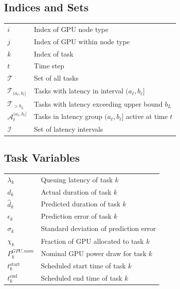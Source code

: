 \documentclass[preprint,12pt]{elsarticle}
\begin{document}
\vspace{1em}

\subsection*{Indices and Sets}
\begin{tabular}{ll}
$i$ & Index of GPU node type \\
$j$ & Index of GPU within node type \\
$k$ & Index of task \\
$t$ & Time step \\
$\mathcal{T}$ & Set of all tasks \\
$\mathcal{T}_{(a_\ell, b_\ell]}$ & Tasks with latency in interval $(a_\ell, b_\ell]$ \\
$\mathcal{T}_{>b_L}$ & Tasks with latency exceeding upper bound $b_L$ \\
$\mathcal{A}_t^{(a_\ell, b_\ell]}$ & Tasks in latency group $(a_\ell, b_\ell]$ active at time $t$ \\
$\mathcal{I}$ & Set of latency intervals \\
\end{tabular}

\vspace{1em}

\subsection*{Task Variables}
\begin{tabular}{ll}
$\lambda_k$ & Queuing latency of task $k$ \\
$d_k$ & Actual duration of task $k$ \\
$\hat{d}_k$ & Predicted duration of task $k$ \\
$\epsilon_k$ & Prediction error of task $k$ \\
$\sigma_k$ & Standard deviation of prediction error  \\
$\chi_k$ & Fraction of GPU allocated to task $k$ \\
$P^{GPU,nom}_k$ & Nominal GPU power draw for task $k$ \\
$t_k^{\text{start}}$ & Scheduled start time of task $k$ \\
$t_k^{\text{end}}$ & Scheduled end time of task $k$ \\
\end{tabular}

\vspace{1em}
\end{document}
